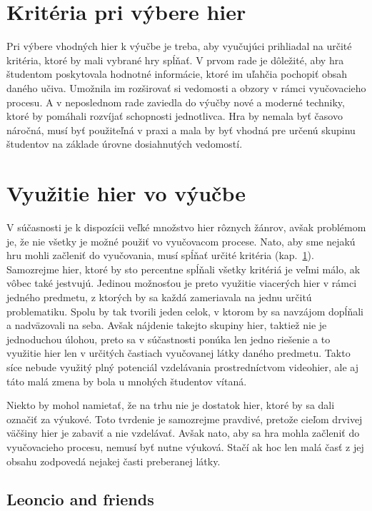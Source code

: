\documentclass[10pt,twoside,slovak,a4paper]{article}
\begin{document}
\section{Kritéria pri výbere hier} \label{kriteria}

Pri výbere vhodných hier k výučbe je treba, aby vyučujúci prihliadal na určité kritéria, ktoré by mali vybrané hry spĺňať. V prvom rade je dôležité, aby hra študentom poskytovala hodnotné informácie, ktoré im uľahčia pochopiť obsah daného učiva. Umožnila im rozširovať si vedomosti a obzory v rámci vyučovacieho procesu. A v neposlednom rade zaviedla do výučby nové a moderné techniky, ktoré by pomáhali rozvíjať schopnosti jednotlivca. Hra by nemala byť časovo náročná, musí byť použiteľná v praxi a mala by byť vhodná pre určenú skupinu študentov na základe úrovne dosiahnutých vedomostí.

\section{Využitie hier vo výučbe} \label{vyuzitie}

V súčasnosti je k dispozícii veľké množstvo hier rôznych žánrov, avšak problémom je, že nie všetky je možné použiť vo vyučovacom procese. Nato, aby sme nejakú hru mohli začleniť do vyučovania, musí spĺňať určité kritéria (kap.~\ref{kriteria}). Samozrejme hier, ktoré by sto percentne spĺňali všetky kritériá je veľmi málo, ak vôbec také jestvujú. Jedinou možnosťou je preto využitie viacerých hier v rámci jedného predmetu, z ktorých by sa každá zameriavala na jednu určitú problematiku. Spolu by tak tvorili jeden celok, v ktorom by sa navzájom dopĺňali a nadväzovali na seba. Avšak nájdenie takejto skupiny hier, taktiež nie je jednoduchou úlohou, preto sa v súčastnosti ponúka len jedno riešenie a to využitie hier len v určitých častiach vyučovanej látky daného predmetu. Takto síce nebude využitý plný potenciál vzdelávania prostredníctvom videohier, ale aj táto malá zmena by bola u mnohých študentov vítaná. 

Niekto by mohol namietať, že na trhu nie je dostatok hier, ktoré by sa dali označiť za výukové. Toto tvrdenie je samozrejme pravdivé, pretože cieľom drvivej väčšiny hier je zabaviť a nie vzdelávať. Avšak nato, aby sa hra mohla začleniť do vyučovacieho procesu, nemusí byť nutne výuková. Stačí ak hoc len malá časť z jej obsahu zodpovedá nejakej časti preberanej látky\cite{Videohry}. 

\subsection{Leoncio and friends} \label{hra-1}
\end{document}
